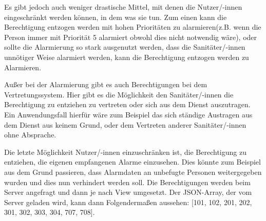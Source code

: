     \noindent Es gibt jedoch auch weniger drastische Mittel, mit denen die Nutzer/-innen eingeschränkt werden können, in dem was sie tun.
    Zum einen kann die Berechtigung entzogen werden mit hohen Prioritäten zu alarmieren(z.B. wenn die Person immer mit Priorität 5 alarmiert obwohl dies nicht notwendig wäre),
    oder sollte die Alarmierung so stark ausgenutzt werden, dass die Sanitäter/-innen unnötiger Weise alarmiert werden, kann die Berechtigung entzogen werden zu Alarmieren.

    \noindent Außer bei der Alarmierung gibt es auch Berechtigungen bei dem Vertretungssystem. Hier gibt es die Möglichkeit den Sanitäter/-innen die Berechtigung zu entziehen zu vertreten oder sich aus 
    dem Dienst auszutragen. Ein Anwendungsfall hierfür wäre zum Beispiel das sich ständige Austragen aus dem Dienst aus keinem Grund, oder dem Vertreten anderer Sanitäter/-innen ohne Absprache.

    \noindent Die letzte Möglichkeit Nutzer/-innen einzuschränken ist, die Berechtigung zu entziehen, die eigenen empfangenen Alarme einzusehen.
    Dies könnte zum Beispiel aus dem Grund passieren, dass Alarmdaten an unbefugte Personen weitergegeben wurden und dies nun verhindert werden soll.
    Die Berechtigungen werden beim Server angefragt und dann je nach View umgesetzt. Der JSON-Array, der vom Server geladen wird, kann dann Folgendermaßen aussehen: [101, 102, 201, 202, 301, 302, 303, 304, 707, 708].